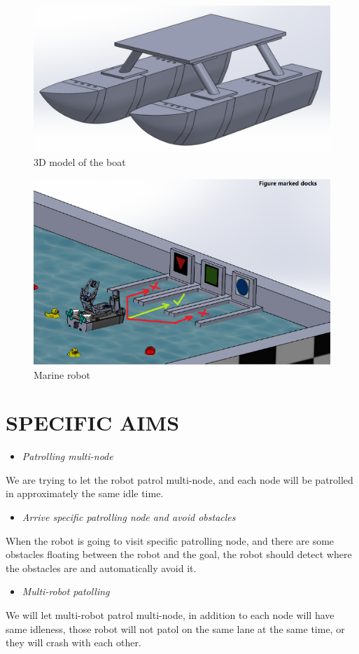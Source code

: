 \documentclass[letterpaper, 10 pt, conference]{ieeeconf}  %
\begin{document}
\begin{figure}[h] %
\includegraphics[width=0.9\columnwidth]{boat_model}
\centering
\caption{3D model of the boat}
 \label{figure:model}
\end{figure}

\begin{figure}[t] %
\includegraphics[width=0.9\columnwidth]{boat}
\centering
\caption{Marine robot}
\label{figure:map}
\end{figure}

\section{SPECIFIC AIMS}

\begin{itemize}
\item \textsl{Patrolling multi-node}
\end{itemize}
We are trying to let the robot patrol multi-node, and each node will be patrolled in approximately the same idle time. 
\begin{itemize}
\item  \textsl{Arrive specific patrolling node and avoid obstacles}
\end{itemize}
When the robot is going to visit specific patrolling node, and there are some obstacles floating between the robot and the goal, the robot should detect where the obstacles are and automatically avoid it.
\begin{itemize}
\item  \textsl{Multi-robot patolling}
\end{itemize}
We will let multi-robot patrol multi-node, in addition to each node will have same idleness, those robot will not patol on the same lane at the same time, or they will crash with each other.
\end{document}
